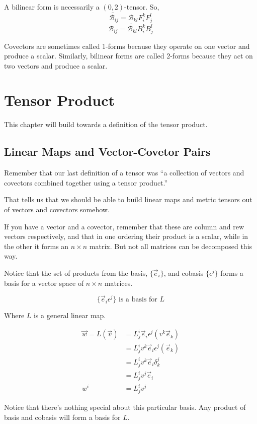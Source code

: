 \documentclass[12pt]{book}
\theoremstyle{plain}
\theoremstyle{definition}
\theoremstyle{ppart}
\theoremstyle{case}
\theoremstyle{solution}
\begin{document}
A bilinear form is necessarily a $(0,2)$-tensor. So,
\[ \widetilde{\mathcal{B}_{ij}} = \mathcal{B}_{kl} F^k_i F^l_j \]
\[ \mathcal{B}_{ij} = \widetilde{\mathcal{B}_{kl}} B^k_i B^l_j \]


Covectors are sometimes called 1-forms because they operate on one vector and produce a scalar. Similarly,
bilinear forms are called 2-forms because they act on two vectors and produce a scalar.

\chapter{Tensor Product}

This chapter will build towards a definition of the tensor product.

\section{Linear Maps and Vector-Covetor Pairs}

Remember that our last definition of a tensor was ``a collection of vectors and covectors combined together
using a tensor product.'' \cite{youtube:tensor10}

That tells us that we should be able to build linear maps and metric tensors out of vectors and covectors
somehow.

If you have a vector and a covector, remember that these are column and rew vectors respectively,
and that in one ordering their product is a scalar, while in the other it forms an $n \times n$ matrix.
But not all matrices can be decomposed this way.

Notice that the set of products from the basis, $\{\vec{e}_i\}$, and cobasis $\{\epsilon^j\}$ forms a basis for a vector space of $n \times n$ matrices.

\[ \{ \vec{e}_i \epsilon^j \} \text{ is a basis for } L \]

Where $L$ is a general linear map.

\begin{align*}
  \vec{w} = L(\vec{v})
  &= L^i_j \vec{e}_i \epsilon^j (v^k \vec{e}_k) \\
  &= L^i_j v^k \vec{e}_i \epsilon^j (\vec{e}_k) \\
  &= L^i_j v^k \vec{e}_i \delta^j_k \\
  &= L^i_j v^j \vec{e}_i \\
  w^i &= L^i_j v^j
\end{align*}

Notice that there's nothing special about this particular basis. Any product of basis and cobasis will form a basis for $L$. 
\end{document}
